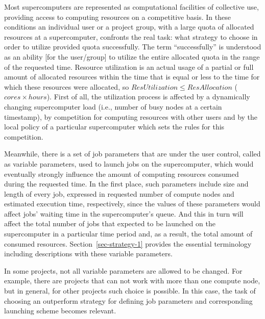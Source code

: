 Most supercomputers are represented as computational facilities of collective
use, providing access to computing resources on a competitive basis.
In these conditions an individual user or a project group, with a large quota
of allocated resources at a supercomputer, confronts the real task: what
strategy to choose in order to utilize provided quota successfully.
The term ``successfully'' is understood as an ability [for the user/group] to
utilize the entire allocated quota in the range of the requested time.
Resource utilization is an actual usage of a partial or full amount of
allocated resources within the time that is equal or less to the time for which
these resources were allocated, so $ResUtilization \leq ResAllocation$
($cores \times hours$).
First of all, the utilization process is affected by a dynamically changing
supercomputer load (i.e., number of busy nodes at a certain timestamp), by
competition for computing resources with other users and by the local policy of
a particular supercomputer which sets the rules for this competition.

Meanwhile, there is a set of job parameters that are under the user control,
called as variable parameters, used to launch jobs on the supercomputer, which
would eventually strongly influence the amount of computing resources consumed
during the requested time.
In the first place, such parameters include size and length of every job,
expressed in requested number of compute nodes and estimated execution time,
respectively, since the values of these parameters would affect jobs' waiting
time in the supercomputer's queue.
And this in turn will affect the total number of jobs that expected to be
launched on the supercomputer in a particular time period and, as a result, the
total amount of consumed resources.
Section~\ref{sec-strategy-1} provides the essential terminology
including descriptions with these variable parameters.


In some projects, not all variable parameters are allowed to be changed.
For example, there are projects that can not work with more than one compute
node, but in general, for other projects such choice is possible.
In this case, the task of choosing an outperform strategy for defining job
parameters and corresponding launching scheme becomes relevant.


